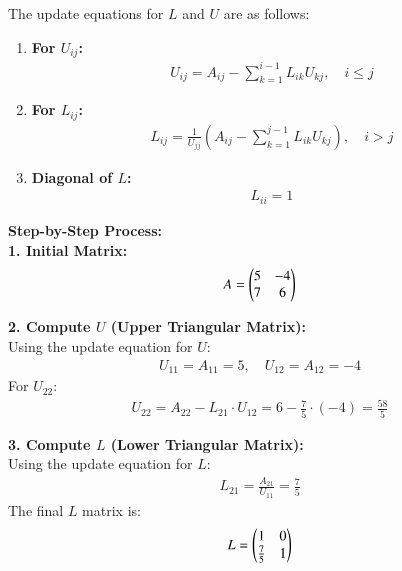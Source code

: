 \documentclass[journal]{IEEEtran}
\begin{document}
The update equations for $L$ and $U$ are as follows:
\begin{enumerate}
    \item \textbf{For $U_{ij}$:}
    \begin{align}
        U_{ij} = A_{ij} - \sum_{k=1}^{i-1} L_{ik} U_{kj}, \quad i \leq j
    \end{align}
    \item \textbf{For $L_{ij}$:}
    \begin{align}
        L_{ij} = \frac{1}{U_{jj}} \left( A_{ij} - \sum_{k=1}^{j-1} L_{ik} U_{kj} \right), \quad i > j
    \end{align}
    \item \textbf{Diagonal of $L$:}
    \begin{align}
        L_{ii} = 1
    \end{align}
\end{enumerate}

\textbf{Step-by-Step Process:}\\

\textbf{1. Initial Matrix:}
\begin{align}
    A = \begin{pmatrix}5 & -4 \\ 7 & 6\end{pmatrix}
\end{align}

\textbf{2. Compute $U$ (Upper Triangular Matrix):}\\
Using the update equation for $U$:
\begin{align}
    U_{11} = A_{11} = 5, \quad U_{12} = A_{12} = -4
\end{align}
For $U_{22}$:
\begin{align}
    U_{22} = A_{22} - L_{21} \cdot U_{12} = 6 - \frac{7}{5} \cdot (-4) = \frac{58}{5}
\end{align}

\textbf{3. Compute $L$ (Lower Triangular Matrix):}\\
Using the update equation for $L$:
\begin{align}
    L_{21} = \frac{A_{21}}{U_{11}} = \frac{7}{5}
\end{align}
The final $L$ matrix is:
\begin{align}
    L = \begin{pmatrix}1 & 0 \\ \frac{7}{5} & 1\end{pmatrix}
\end{align}
\end{document}
